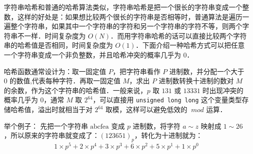 
字符串哈希和普通的哈希算法类似，字符串哈希是把一个很长的字符串变成一个整数，这样的好处是：如果想比较两个很长的字符串是否相等时，普通算法是遍历一遍整个字符串，如果其中一个字符串的字符和另一个字符串的字符不等，则两个字符串不一样．时间复杂度为 $O(N)$．而用字符串哈希的话可以直接比较两个字符串的哈希值是否相同，时间复杂度为 $O(1)$．下面介绍一种哈希方式可以把任意一个字符串变成一个非负整数，并且哈希冲突的概率几乎为 $0$．

哈希函数通常设计为：取一固定值 $P$，把字符串看作 $P$ 进制数，并分配一个大于 $0$ 的数值,代表每种字符．再取一固定值 $M$，求出 $P$ 进制数转换十进制的数对 $M$ 的余数，作为这个字符串的哈希值．一般来说，$p$ 取 $131$ 或 $13331$ 时出现冲突的概率几乎为 $0$，通常 $M$ 取 $2^{64}$，可以直接用 \verb|unsigned long long| 这个变量类型存储哈希值，溢出时就相当于对 $2^{64}$ 取模，这样可以避免低效的 $\ mod$ 运算．


举个例子：
先把一个字符串 $\text{abcfea}$ 变成 $p$ 进制数，将字符 $a \sim z$ 映射成 $1 \sim 26$，所以原来的字符串就变成了：$(123651)_p$，转化为十进制就为：\begin{equation}
1 \times p^5 + 2 \times p^4 + 3 \times p^3 + 6 \times p^2 + 5 \times p^1 + 1 \times p^0
\end{equation}
